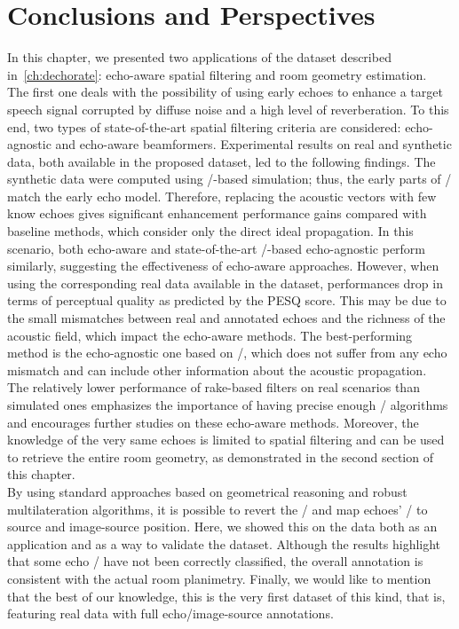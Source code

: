 \section{Conclusions and Perspectives}\label{sec:dechorateapp:conclusion}
In this chapter, we presented two applications of the \dEchorate{} dataset described in~\cref{ch:dechorate}: echo-aware spatial filtering and room geometry estimation.
\\The first one deals with the possibility of using early echoes to enhance a target speech signal corrupted by diffuse noise and a high level of reverberation.
To this end, two types of state-of-the-art spatial filtering criteria are considered: echo-agnostic and echo-aware beamformers.
Experimental results on real and synthetic data, both available in the proposed dataset, led to the following findings.
The synthetic data were computed using \ISM/-based simulation; thus, the early parts of \RIRs/ match the early echo model.
Therefore, replacing the acoustic vectors with few know echoes gives significant enhancement performance gains compared with baseline methods, which consider only the direct ideal propagation.
In this scenario, both echo-aware and state-of-the-art \ReTF/-based echo-agnostic perform similarly, suggesting the effectiveness of echo-aware approaches.
However, when using the corresponding real data available in the dataset, performances drop in terms of perceptual quality as predicted by the \acs{PESQ} score.
This may be due to the small mismatches between real and annotated echoes and the richness of the acoustic field, which impact the echo-aware methods.
The best-performing method is the echo-agnostic one based on \ReTF/, which does not suffer from any echo mismatch and can include other information about the acoustic propagation.
\\The relatively lower performance of rake-based filters on real scenarios than simulated ones emphasizes the importance of having precise enough \AER/ algorithms and encourages further studies on these echo-aware methods.
Moreover, the knowledge of the very same echoes is limited to spatial filtering and can be used to retrieve the entire room geometry, as demonstrated in the second section of this chapter.
\\By using standard approaches based on geometrical reasoning and robust multilateration algorithms, it is possible to revert the \ISM/ and map echoes' \TOAs/ to source and image-source position.
Here, we showed this on the \dEchorate data both as an application and as a way to validate the dataset.
Although the results highlight that some echo \TOAs/ have not been correctly classified, the overall annotation is consistent with the actual room planimetry.
Finally, we would like to mention that the best of our knowledge, this is the very first dataset of this kind, that is, featuring real data with full echo/image-source annotations.

